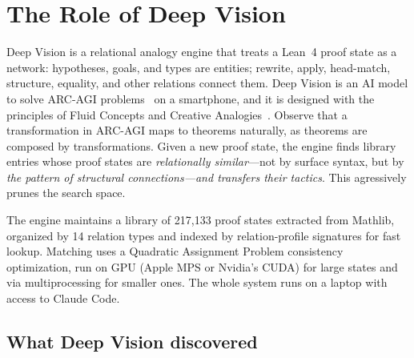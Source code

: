 \documentclass[11pt]{article}
\theoremstyle{definition}
\theoremstyle{remark}
\begin{document}
\section{The Role of Deep Vision}

Deep Vision is a relational analogy engine that treats a Lean~4 proof state as a network: hypotheses, goals, and types are entities; rewrite, apply, head-match, structure, equality, and other relations connect them. Deep Vision is an AI model to solve ARC-AGI problems~\cite{chollet_measure_2019} on a smartphone, and it is designed with the principles of Fluid Concepts and Creative Analogies~\cite{hofstadter_fluid_1995, hofstadter_go_1999, hofstadter_surfaces_2013, hofstadter_copycat_1984, mitchell_emergence_1990, chalmers_high-level_1992, french_tabletop_1991, foundalis_phaeaco_2006, rehling_letter_2001, nichols_musicat_2012, linhares_active_2005, linhares_understanding_2007, linhares_questioning_2010, linhares_entanglement_2012, linhares_what_2013, linhares_emergence_2014, linhares_deep_vision, linhares_deep_vision_chess, mitchell_analogy_1993}. Observe that a transformation in ARC-AGI maps to theorems naturally, as theorems are composed by transformations.  Given a new proof state, the engine finds library entries whose proof states are \emph{relationally similar}---not by surface syntax, but by \emph{the pattern of structural connections---and transfers their tactics}.  This agressively prunes the search space. 

The engine maintains a library of 217{,}133 proof states extracted from Mathlib, organized by 14 relation types and indexed by relation-profile signatures for fast lookup. Matching uses a Quadratic Assignment Problem consistency optimization, run on GPU (Apple MPS or Nvidia's CUDA) for large states and via multiprocessing for smaller ones. The whole system runs on a laptop with access to Claude Code.

\subsection{What Deep Vision discovered}
\end{document}
